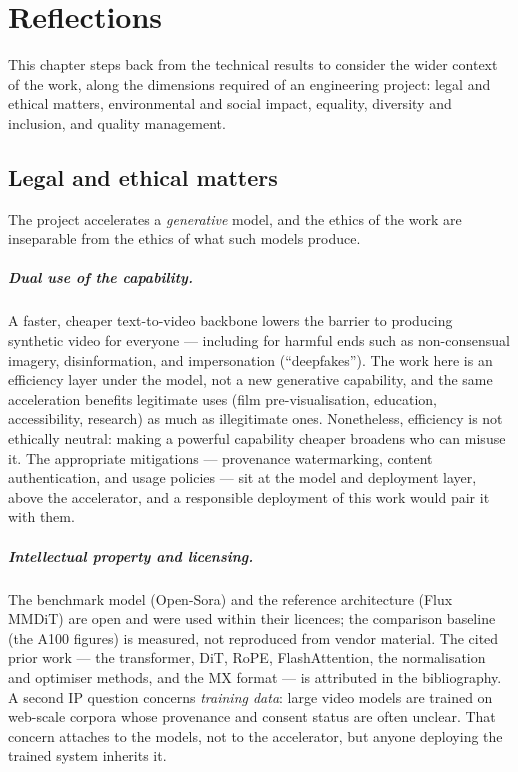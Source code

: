\documentclass[11pt]{report}
\begin{document}
\chapter{Reflections}
\label{ch:reflections}

This chapter steps back from the technical results to consider the wider
context of the work, along the dimensions required of an engineering
project: legal and ethical matters, environmental and social impact,
equality, diversity and inclusion, and quality management.

\section{Legal and ethical matters}

The project accelerates a \emph{generative} model, and the ethics of the
work are inseparable from the ethics of what such models produce.

\paragraph{Dual use of the capability.} A faster, cheaper text-to-video
backbone lowers the barrier to producing synthetic video for everyone ---
including for harmful ends such as non-consensual imagery, disinformation,
and impersonation (``deepfakes''). The work here is an efficiency layer
under the model, not a new generative capability, and the same acceleration
benefits legitimate uses (film pre-visualisation, education, accessibility,
research) as much as illegitimate ones. Nonetheless, efficiency is not
ethically neutral: making a powerful capability cheaper broadens who can
misuse it. The appropriate mitigations --- provenance watermarking, content
authentication, and usage policies --- sit at the model and deployment
layer, above the accelerator, and a responsible deployment of this work
would pair it with them.

\paragraph{Intellectual property and licensing.} The benchmark model
(Open-Sora) and the reference architecture (Flux MMDiT) are open and were
used within their licences; the comparison baseline (the A100 figures) is
measured, not reproduced from vendor material. The cited prior work ---
the transformer, DiT, RoPE, FlashAttention, the normalisation and optimiser
methods, and the MX format --- is attributed in the bibliography. A second
IP question concerns \emph{training data}: large video models are trained on
web-scale corpora whose provenance and consent status are often unclear.
That concern attaches to the models, not to the accelerator, but anyone
deploying the trained system inherits it.
\end{document}
